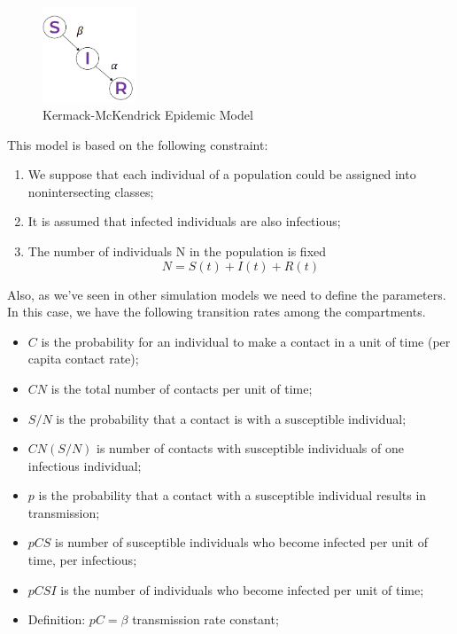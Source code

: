 \begin{figure}[!ht]
    \centering
    \includegraphics[width=0.25\textwidth]{img/SIR.png}
    \caption{Kermack-McKendrick Epidemic Model}
    \label{fig:SIR}
\end{figure}

This model is based on the following constraint:
\begin{enumerate}
    \item We suppose that each individual of a population could be 
        assigned into nonintersecting classes;
    \item It is assumed that infected individuals are also infectious;
    \item The number of individuals N in the population is fixed
        \begin{equation*}
            N = S(t) + I(t) + R(t)
        \end{equation*}
\end{enumerate}

Also, as we've seen in other simulation models we need to define the 
parameters. In this case, we have the following transition rates among 
the compartments.
\begin{itemize}
    \item $C$ is the probability for an individual to make a contact in 
        a unit of time (per capita contact rate);
    \item $C N$ is the total number of contacts per unit of time;
    \item $S/N$ is the probability that a contact is with a susceptible 
        individual;
    \item $C N (S/N)$ is number of contacts with susceptible individuals 
        of one infectious individual;
    \item $p$ is the probability that a contact with a susceptible 
        individual results in transmission;
    \item $p C S$ is number of susceptible individuals who become 
        infected per unit of time, per infectious;
    \item $p C S I$ is the number of individuals who become infected 
        per unit of time;
    \item Definition: $pC = \beta$ transmission rate constant;
\end{itemize}

